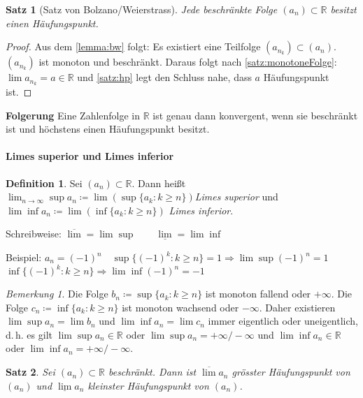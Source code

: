 \documentclass[ngerman,titlepage,twoside, parskip=half*]{scrreprt}
\newcommand*{\R}{\mathbb{R}}
\theoremstyle{plain}
\newtheorem{theorem}{Satz}[section]
\theoremstyle{definition}
\newtheorem{definition}{Definition}
\theoremstyle{remark}
\newtheorem*{remark}{Bemerkung}
\begin{document}
\begin{theorem}[Satz von Bolzano/Weierstrass]
\label{satz:bw}
Jede beschränkte Folge $(a_n)\subset \R$ besitzt einen
Häufungspunkt.
\end{theorem}
\begin{proof}
  Aus dem \autoref{lemma:bw} folgt: Es existiert eine Teilfolge
  $(a_{n_k})\subset (a_n)$. $(a_{n_k})$ ist monoton und
  beschränkt. Daraus folgt nach \autoref{satz:monotoneFolge}: $\lim
  a_{n_k}=a \in \R$ und \autoref{satz:hp} legt den Schluss nahe, dass
  $a$ Häufungspunkt ist.
\end{proof}

\textbf{Folgerung} Eine Zahlenfolge in $\R$ ist genau dann konvergent, wenn sie beschränkt ist und höchstens einen Häufungspunkt besitzt.

\paragraph{Limes superior und Limes inferior}
\begin{definition}
Sei $(a_n) \subset \R$. Dann heißt $\lim_{n\rightarrow \infty} \sup a_n\coloneqq\lim(\sup\{a_k\colon k\geq n\})$\emph{Limes superior} und $\lim \inf a_n \coloneqq 
\lim (\inf\{a_k\colon k\geq n\})$ \emph{Limes inferior}.
\end{definition}

Schreibweise: $\overline{\lim}=\lim \sup \qquad \underline{\lim}=\lim \inf$

Beispiel: $a_n=(-1)^n \quad \sup \{(-1)^k\colon k\geq n\}=1 \Rightarrow \lim \sup (-1)^n=1$\\
$\inf\{(-1)^k\colon k\geq n\} \Rightarrow \lim \inf (-1)^n=-1$

\begin{remark}
Die Folge $b_n\coloneqq\sup \{a_k\colon k\geq n\}$ ist monoton fallend oder $+\infty$. Die Folge $c_n\coloneqq\inf\{a_k\colon k\geq n\}$ ist
monoton wachsend oder $-\infty$. Daher existieren $\lim\sup a_n=\lim b_n$ und $\lim \inf a_n=\lim c_n$ immer eigentlich
oder uneigentlich, d.\,h. es gilt $\lim \sup a_n \in \R$ oder $\lim \sup a_n=+\infty/-\infty$ und 
$\lim \inf a_n \in \R$ oder $\lim \inf a_n=+\infty/-\infty$.
\end{remark}

\begin{theorem}
Sei $(a_n) \subset \R$ beschränkt. Dann ist $\overline{\lim} a_n$ grösster
  Häufungspunkt von $(a_n)$ und $\underline{\lim} a_n$ kleinster Häufungspunkt
  von $(a_n)$.
\end{theorem}
\end{document}
